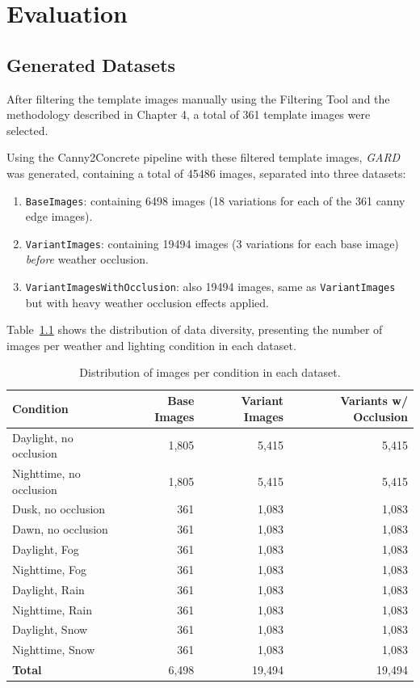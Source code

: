 \chapter{Evaluation}

\section{Generated Datasets}

After filtering the template images manually using the Filtering Tool and
the methodology described in Chapter 4, a total of 361 template images were
selected.

Using the Canny2Concrete pipeline with these filtered template images,
\emph{GARD} was generated, containing a total of 45486 images, separated
into three datasets:

\begin{enumerate}
\item \texttt{BaseImages}: containing 6498 images (18 variations for each of the 361 canny edge images).
\item \texttt{VariantImages}: containing 19494 images (3 variations for each base image) \emph{before} weather occlusion.
\item \texttt{VariantImagesWithOcclusion}: also 19494 images, same as
  \texttt{VariantImages} but with heavy weather occlusion effects applied.
\end{enumerate}

Table~\ref{tab:dataset_distribution} shows the distribution of data diversity,
presenting the number of images per weather and lighting condition in each dataset.

\begin{table}[h]
\centering
\caption{Distribution of images per condition in each dataset.}
\label{tab:dataset_distribution}
\begin{tabular}{|l|r|r|r|}
\hline
\textbf{Condition} & \textbf{Base Images} & \textbf{Variant Images} &
  \textbf{Variants w/ Occlusion} \\
\hline
Daylight, no occlusion     & 1,805 & 5,415 & 5,415 \\
Nighttime, no occlusion    & 1,805 & 5,415 & 5,415 \\
Dusk, no occlusion         & 361   & 1,083 & 1,083 \\
Dawn, no occlusion         & 361   & 1,083 & 1,083 \\
Daylight, Fog              & 361   & 1,083 & 1,083 \\
Nighttime, Fog              & 361   & 1,083 & 1,083 \\
Daylight, Rain             & 361   & 1,083 & 1,083 \\
Nighttime, Rain             & 361   & 1,083 & 1,083 \\
Daylight, Snow             & 361   & 1,083 & 1,083 \\
Nighttime, Snow            & 361   & 1,083 & 1,083 \\
\hline
\textbf{Total}             & 6,498 & 19,494 & 19,494 \\
\hline
\end{tabular}
\end{table}

